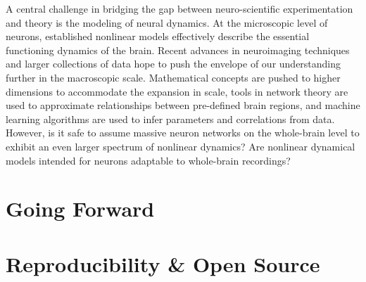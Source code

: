 A central challenge in bridging the gap between neuro-scientific experimentation and theory is the modeling of neural dynamics. At the microscopic level of neurons, established nonlinear models effectively describe the essential functioning dynamics of the brain. Recent advances in neuroimaging techniques and larger collections of data hope to push the envelope of our understanding further in the macroscopic scale. Mathematical concepts are pushed to higher dimensions to accommodate the expansion in scale, tools in network theory are used to approximate relationships between pre-defined brain regions, and machine learning algorithms are used to infer parameters and correlations from data. However, is it safe to assume massive neuron networks on the whole-brain level to exhibit an even larger spectrum of nonlinear dynamics? Are nonlinear dynamical models intended for neurons adaptable to whole-brain recordings?



\section{Going Forward}


\section{Reproducibility \& Open Source}
